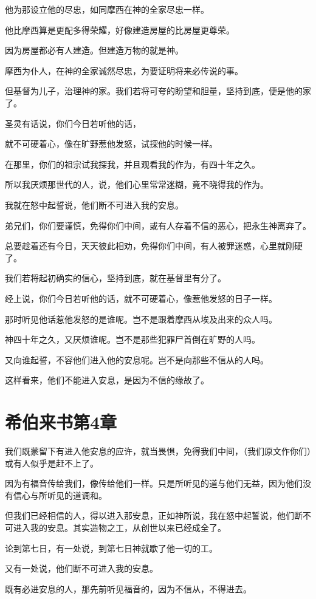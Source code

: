\documentclass[12pt,oneside]{book}
\begin{document}
他为那设立他的尽忠，如同摩西在神的全家尽忠一样。

他比摩西算是更配多得荣耀，好像建造房屋的比房屋更尊荣。

因为房屋都必有人建造。但建造万物的就是神。

摩西为仆人，在神的全家诚然尽忠，为要证明将来必传说的事。

但基督为儿子，治理神的家。我们若将可夸的盼望和胆量，坚持到底，便是他的家了。

圣灵有话说，你们今日若听他的话，

就不可硬着心，像在旷野惹他发怒，试探他的时候一样。

在那里，你们的祖宗试我探我，并且观看我的作为，有四十年之久。

所以我厌烦那世代的人，说，他们心里常常迷糊，竟不晓得我的作为。

我就在怒中起誓说，他们断不可进入我的安息。

弟兄们，你们要谨慎，免得你们中间，或有人存着不信的恶心，把永生神离弃了。

总要趁着还有今日，天天彼此相劝，免得你们中间，有人被罪迷惑，心里就刚硬了。

我们若将起初确实的信心，坚持到底，就在基督里有分了。

经上说，你们今日若听他的话，就不可硬着心，像惹他发怒的日子一样。

那时听见他话惹他发怒的是谁呢。岂不是跟着摩西从埃及出来的众人吗。

神四十年之久，又厌烦谁呢。岂不是那些犯罪尸首倒在旷野的人吗。

又向谁起誓，不容他们进入他的安息呢。岂不是向那些不信从的人吗。

这样看来，他们不能进入安息，是因为不信的缘故了。

\chapter{希伯来书第4章}
我们既蒙留下有进入他安息的应许，就当畏惧，免得我们中间，（我们原文作你们）或有人似乎是赶不上了。

因为有福音传给我们，像传给他们一样。只是所听见的道与他们无益，因为他们没有信心与所听见的道调和。

但我们已经相信的人，得以进入那安息，正如神所说，我在怒中起誓说，他们断不可进入我的安息。其实造物之工，从创世以来已经成全了。

论到第七日，有一处说，到第七日神就歇了他一切的工。

又有一处说，他们断不可进入我的安息。

既有必进安息的人，那先前听见福音的，因为不信从，不得进去。
\end{document}
